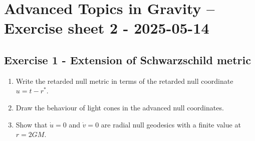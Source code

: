 \documentclass[10pt,a4paper]{article}
\theoremstyle{definition}
\begin{document}
\newpage
\section*{Advanced Topics in Gravity – Exercise sheet 2 - 2025-05-14}
\subsection*{Exercise 1 - Extension of Schwarzschild metric}
{\color{blue}
\begin{enumerate}
\item Write the retarded null metric in terms of the retarded null coordinate $u = t- r^*$.
\item Draw the behaviour of light cones in the advanced null coordinates.
\item Show that $\dot{u} = 0$ and $\dot{v} = 0$ are radial null geodesics with a finite value at $r = 2GM$.
\end{enumerate}
}
\end{document}
